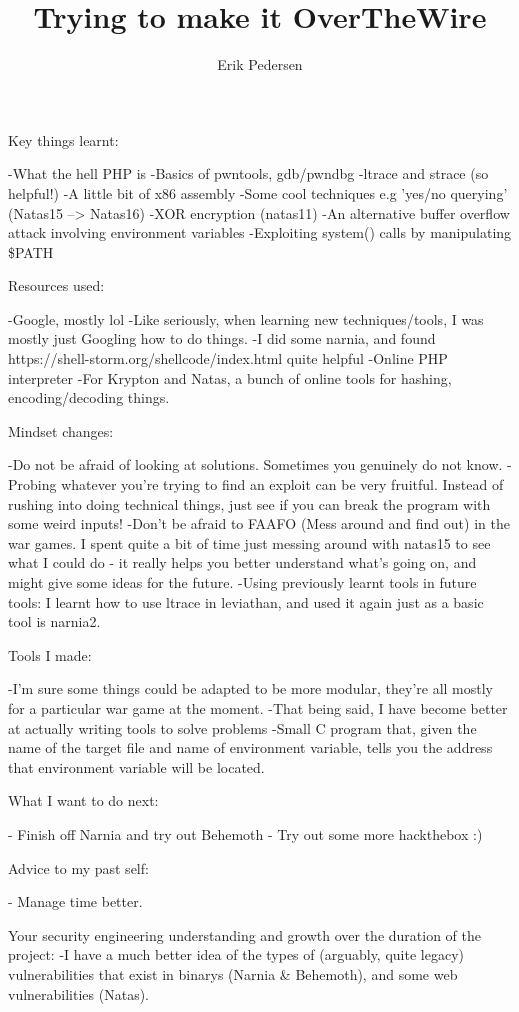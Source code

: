 \documentclass{article}
\title{Trying to make it OverTheWire}
\author{Erik Pedersen}
\begin{document}
Key things learnt:

	-What the hell PHP is
	-Basics of pwntools, gdb/pwndbg
	-ltrace and strace (so helpful!)
	-A little bit of x86 assembly
	-Some cool techniques e.g 'yes/no querying' (Natas15 --> Natas16)
	-XOR encryption (natas11)
	-An alternative buffer overflow attack involving environment variables
	-Exploiting system() calls by manipulating \$PATH

Resources used:

	-Google, mostly lol
		-Like seriously, when learning new techniques/tools, I was mostly just Googling how to do things.
	-I did some narnia, and found https://shell-storm.org/shellcode/index.html quite helpful
	-Online PHP interpreter
	-For Krypton and Natas, a bunch of online tools for hashing, encoding/decoding things.

Mindset changes:

	-Do not be afraid of looking at solutions. Sometimes you genuinely do not know.
	-Probing whatever you're trying to find an exploit can be very fruitful. Instead of rushing into doing technical things, just see if you can break the program with some weird inputs!
	-Don't be afraid to FAAFO (Mess around and find out) in the war games. I spent quite a bit of time just messing around with natas15 to see what I could do - it really helps you better understand what's going on, and might give some ideas for the future.
	-Using previously learnt tools in future tools: I learnt how to use ltrace in leviathan, and used it again just as a basic tool is narnia2.

Tools I made:

	-I'm sure some things could be adapted to be more modular, they're all mostly for a particular war game at the moment.
	-That being said, I have become better at actually writing tools to solve problems
	-Small C program that, given the name of the target file and name of environment variable, tells you the address that environment variable will be located.
	 

What I want to do next:

	- Finish off Narnia and try out Behemoth
	- Try out some more hackthebox :)

Advice to my past self:
	
	- Manage time better.

Your security engineering understanding and growth over the duration of the project:
	-I have a much better idea of the types of (arguably, quite legacy) vulnerabilities that exist in binarys (Narnia & Behemoth), and some web vulnerabilities (Natas). 
\end{document}
